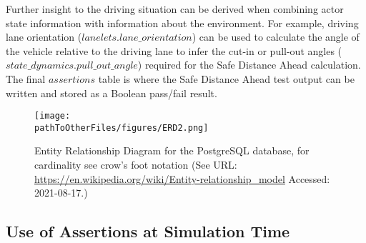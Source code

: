 Further insight to the driving situation can be derived when combining actor state information with information about the environment. For example, driving lane orientation ($lanelets.lane\_orientation$) can be used to calculate the angle of the vehicle relative to the driving lane to infer the cut-in or pull-out angles ($state\_dynamics.pull\_out\_angle$) required for the Safe Distance Ahead calculation. The final $assertions$ table is where the Safe Distance Ahead test output can be written and stored as a Boolean pass/fail result.

\begin{figure}
    \centering
    \texttt{[image: \\pathToOtherFiles/figures/ERD2.png]}
    \caption{Entity Relationship Diagram for the PostgreSQL database, for cardinality see crow's foot notation (See URL: \url{https://en.wikipedia.org/wiki/Entity-relationship\_model} Accessed: 2021-08-17.)}
    \label{fig:erd}
\end{figure}


\subsection{Use of Assertions at Simulation Time} \label{Assertions_at_Sim_Time}

